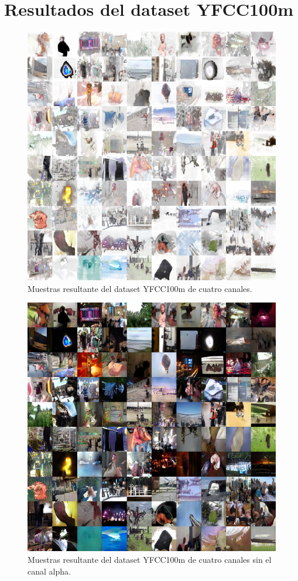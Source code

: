 \documentclass[spanish]{report}
\begin{document}
\chapter{Resultados del dataset YFCC100m}\label{apendice:sin_filtrar}
\begin{figure}[H]
\centering
 \includegraphics[width=\linewidth]{resultados/4chan_normal.png}
   \caption{Muestras resultante del dataset YFCC100m de cuatro canales.}
  \label{fig:resultado_sin_filtrar1}
\end{figure}

\begin{figure}[h]
\centering
 \includegraphics[width=\linewidth]{resultados/4chan_noalpha.png}
   \caption{Muestras resultante del dataset YFCC100m de cuatro canales sin el canal alpha.}
  \label{fig:resultado_sin_filtrar2}
\end{figure}
\end{document}
